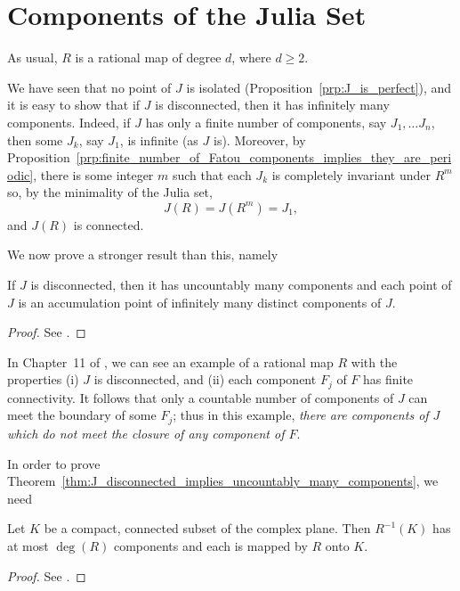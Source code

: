 \section{Components of the Julia Set}

As usual, $R$ is a rational map of degree $d$, where $d \geq 2$.

\begin{remark}
    We have seen that no point of $J$ is isolated
    (Proposition~\ref{prp:J_is_perfect}), and it is easy to show that if $J$ is
    disconnected, then it has infinitely many components. Indeed, if $J$ has
    only a finite number of components, say $J_1, \dots J_n$, then some $J_k$,
    say $J_1$, is infinite (as $J$ is). Moreover, by
    Proposition~\ref{prp:finite_number_of_Fatou_components_implies_they_are_periodic},
    there is some integer $m$ such that each $J_k$ is completely invariant under
    $R^m$ so, by the minimality of the Julia set,
    \begin{equation*}
        J(R) = J(R^m) = J_1,
    \end{equation*}
    and $J(R)$ is connected.
\end{remark}

We now prove a stronger result than this, namely

\begin{theorem}
    \label{thm:J_disconnected_implies_uncountably_many_components}
    If $J$ is disconnected, then it has uncountably many components and each
    point of $J$ is an accumulation point of infinitely many distinct components
    of $J$.
\end{theorem}
\begin{proof}
    See \cite[95--96]{Beardon1991}.
\end{proof}

In Chapter~11 of \cite{Beardon1991}, we can see an example of a rational map $R$
with the properties (i) $J$ is disconnected, and (ii) each component $F_j$ of
$F$ has finite connectivity. It follows that only a countable number of
components of $J$ can meet the boundary of some $F_j$; thus in this example,
\emph{there are components of $J$ which do not meet the closure of any component
of $F$}.

In order to prove
Theorem~\ref{thm:J_disconnected_implies_uncountably_many_components}, we need

\begin{lemma}
    Let $K$ be a compact, connected subset of the complex plane. Then
    $R^{-1}(K)$ has at most $\deg(R)$ components and each is mapped by $R$ onto
    $K$.
\end{lemma}
\begin{proof}
    See \cite[96--98]{Beardon1991}.
\end{proof}